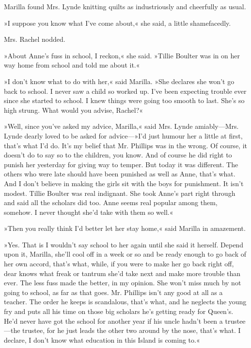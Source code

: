 Marilla found Mrs. Lynde knitting quilts as industriously and cheerfully as usual.

»I suppose you know what I've come about,« she said, a little shamefacedly.

Mrs. Rachel nodded.

»About Anne's fuss in school, I reckon,« she said. »Tillie Boulter was in on her way home from school and told me about it.«

»I don't know what to do with her,« said Marilla. »She declares she won't go back to school. I never saw a child so worked up. I've been expecting trouble ever since she started to school. I knew things were going too smooth to last. She's so high strung. What would you advise, Rachel?«

»Well, since you've asked my advice, Marilla,« said Mrs. Lynde amiably—Mrs. Lynde dearly loved to be asked for advice—»I'd just humour her a little at first, that's what I'd do. It's my belief that Mr. Phillips was in the wrong. Of course, it doesn't do to say so to the children, you know. And of course he did right to punish her yesterday for giving way to temper. But today it was different. The others who were late should have been punished as well as Anne, that's what. And I don't believe in making the girls sit with the boys for punishment. It isn't modest. Tillie Boulter was real indignant. She took Anne's part right through and said all the scholars did too. Anne seems real popular among them, somehow. I never thought she'd take with them so well.«

»Then you really think I'd better let her stay home,« said Marilla in amazement.

»Yes. That is I wouldn't say school to her again until she said it herself. Depend upon it, Marilla, she'll cool off in a week or so and be ready enough to go back of her own accord, that's what, while, if you were to make her go back right off, dear knows what freak or tantrum she'd take next and make more trouble than ever. The less fuss made the better, in my opinion. She won't miss much by not going to school, as far as that goes. Mr. Phillips isn't any good at all as a teacher. The order he keeps is scandalous, that's what, and he neglects the young fry and puts all his time on those big scholars he's getting ready for Queen's. He'd never have got the school for another year if his uncle hadn't been a trustee—the trustee, for he just leads the other two around by the nose, that's what. I declare, I don't know what education in this Island is coming to.«

